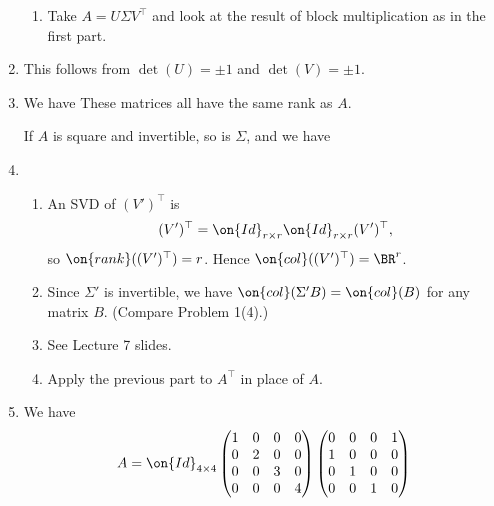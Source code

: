 \documentclass[10pt]{amsart}
\theoremstyle{mythm}
\theoremstyle{definition}
\theoremstyle{myrmk}
\begin{document}
\begin{enumerate}[label=\arabic*.]
\begin{enumerate}[label=(\arabic*)]
			\item Take $A = U \Sigma V^\top$ and look at the result of block multiplication as in the first part. 
		\end{enumerate}
		\item This follows from $\det(U) = \pm 1$ and $\det(V) = \pm 1$. 
		\item We have 
		These matrices all have the same rank as $A$. 
		
		If $A$ is square and invertible, so is $\Sigma$, and we have 
		\item \begin{enumerate}[label=(\arabic*)]
			\item An SVD of $(V')^\top$ is 
			\[
			(V')^{\top} = \on{Id}_{r \times r} \on{Id}_{r \times r} (V')^{\top}, 
			\]
			so $\on{rank}((V')^\top) = r$. Hence $\on{col}((V')^\top) = \BR^r$. 
			\item Since $\Sigma'$ is invertible, we have $\on{col}(\Sigma'B) = \on{col}(B)$ for any matrix $B$. (Compare Problem 1(4).) 
			\item See Lecture 7 slides. 
			\item Apply the previous part to $A^\top$ in place of $A$. 
		\end{enumerate}
		\item We have 
		\[
			A = \on{Id}_{4 \times 4} \begin{pmatrix}
			1 & 0 & 0 & 0 \\ 0 & 2 & 0 & 0 \\ 0 & 0 & 3 & 0 \\ 0 & 0 & 0 & 4
			\end{pmatrix} \begin{pmatrix}
			0 & 0 & 0 & 1 \\ 1 & 0 & 0 & 0 \\ 0 & 1 & 0  & 0 \\ 0 & 0 & 1 & 0 \end{pmatrix}
		\]
	\end{enumerate}
	
	
\end{document}
